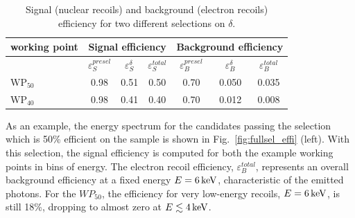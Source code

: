 \begin{table}[t]
\caption{Signal (nuclear recoils) and background (electron recoils) efficiency for
  two different selections on $\delta$.\label{tab:roc}}
\vspace{10pt}
\normalsize
\centering
\begin{tabular}{l c c c | c c c }
  \hline\hline
  working point & \multicolumn{3}{c}{Signal efficiency} & \multicolumn{3}{c}{Background efficiency} \\
  \hline
  & $\varepsilon_{S}^{presel}$ & $\varepsilon_{S}^{\delta}$ & $\varepsilon_{S}^{total}$ & $\varepsilon_{B}^{presel}$ & $\varepsilon_{B}^{\delta}$ & $\varepsilon_{B}^{total}$ \\
  \hline
  $\mathrm{WP}_{50}$  & 0.98                        & 0.51                      & 0.50                     & 0.70                     & 0.050                     & 0.035 \\
  $\mathrm{WP}_{40}$  & 0.98                        & 0.41                      & 0.40                     & 0.70                     & 0.012                     & 0.008 \\
  \hline\hline
\end{tabular}
\end{table}

As an example, the energy spectrum for the candidates passing the
selection which is 50\% efficient on the \ambe sample is shown in
Fig.~\ref{fig:fullsel_effi} (left). With this selection, the signal
efficiency is computed for both the example working points in bins of
energy. The electron recoil efficiency, $\varepsilon_{B}^{total}$,
represents an overall background efficiency at a fixed energy
$E=6\,\textrm{ke\hspace{-.08em}V}$, characteristic of the \fe emitted photons. For the
$WP_{50}$, the efficiency for very low-energy recoils, $E=6\,\textrm{ke\hspace{-.08em}V}$, is
still 18\%, dropping to almost zero at $E\lesssim4\,\textrm{ke\hspace{-.08em}V}$.

